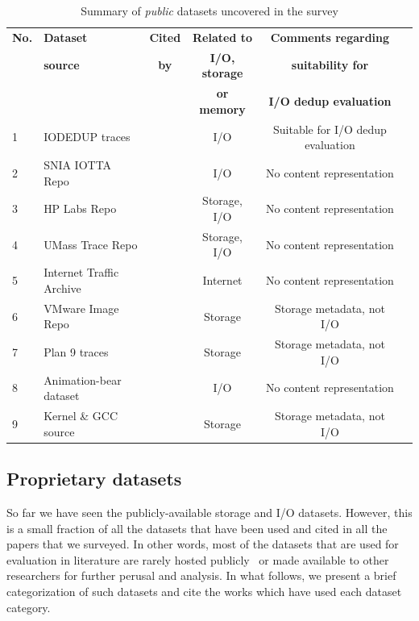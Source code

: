 \begin{table} [t]
	\begin{tabular}{|l|l|c|c|c|l|} \hline
	\textbf{No.} & \textbf{Dataset} & \textbf{Cited} & \textbf{Related to} & \textbf{Comments regarding} \\
	\textbf{} & \textbf{source} & \textbf{by} & \textbf{I/O, storage} & \textbf{suitability for} \\
	\textbf{} & \textbf{} & \textbf{} & \textbf{or memory} & \textbf{I/O dedup evaluation} \\ \hline
	1 & IODEDUP traces & \cite{iodedup} & I/O & Suitable for I/O dedup evaluation \\ 
	2 & SNIA IOTTA Repo & \cite{flexi-replay, winservers, metadata-evolution, tracefs} & I/O & No content representation \\ 
	3 & HP Labs Repo & \cite{storage-system-security, hplabs-repo} & Storage, I/O & No content representation \\
	4 & UMass Trace Repo & \cite{flexi-replay, intradisk-parallelism, memorybuddies} & Storage, I/O & No content representation \\
	5 & Internet Traffic Archive & \cite{failure-of-poisson, search-for-invariants, ita-repo} & Internet & No content representation \\
	6 & VMware Image Repo & \cite{p-dedupe, ddelta} & Storage & Storage metadata, not I/O \\
	7 & Plan 9 traces & \cite{venti} & Storage & Storage metadata, not I/O \\
	8 & Animation-bear dataset & \cite{animation-bear} & I/O & No content representation \\ 
	9 & Kernel \& GCC source & \cite{p-dedupe, ddelta} & Storage & Storage metadata, not I/O \\ \hline
	\end{tabular}
	\caption{Summary of \textit{public} datasets uncovered in the survey}
	\label{tab:public-listed}
\end{table}

\subsection{Proprietary datasets}
So far we have seen the publicly-available storage and I/O datasets. However,
this is a small fraction of all the datasets that have been used and cited
in all the papers that we surveyed. In other words, most of the datasets that
are used for evaluation in literature are rarely hosted 
publicly~\cite{generating-datasets} or made
available to other researchers for further perusal and analysis. In what
follows, we present a brief categorization of such datasets and cite the
works which have used each dataset category.

